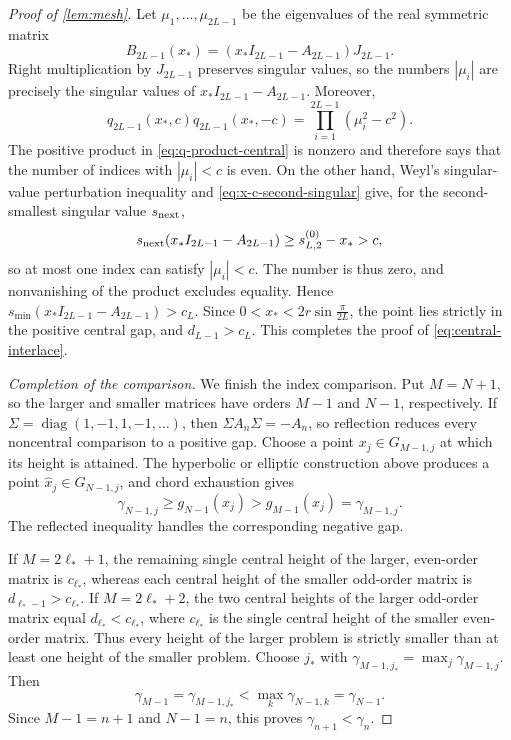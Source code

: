 \documentclass[review,hidelinks,onefignum,onetabnum]{siamart251216}
\DeclareMathOperator{\diag}{diag}
\begin{document}
\begin{proof}[Proof of \cref{lem:mesh}]
Let \(\mu_1,\ldots,\mu_{2L-1}\) be the eigenvalues of the real symmetric
matrix
\[
 B_{2L-1}(x_*)=(x_*I_{2L-1}-A_{2L-1})J_{2L-1}.
\]
Right multiplication by \(J_{2L-1}\) preserves singular values, so the
numbers \(|\mu_i|\) are precisely the singular values of
\(x_*I_{2L-1}-A_{2L-1}\).  Moreover,
\[
 q_{2L-1}(x_*,c)q_{2L-1}(x_*,-c)
 =\prod_{i=1}^{2L-1}(\mu_i^2-c^2).
\]
The positive product in \eqref{eq:q-product-central} is nonzero and
therefore says that the number of indices with \(|\mu_i|<c\) is
even.  On the other hand, Weyl's singular-value perturbation inequality
and \eqref{eq:x-c-second-singular} give, for the second-smallest singular
value \(s_{\rm next}\),
\[
 s_{\rm next}(x_*I_{2L-1}-A_{2L-1})
 \geq s_{L,2}^{(0)}-x_*>c,
\]
so at most one index can satisfy \(|\mu_i|<c\).  The number is thus
zero, and nonvanishing of the product excludes equality.  Hence
\(s_{\min}(x_*I_{2L-1}-A_{2L-1})>c_L\).  Since
\(0<x_*<2r\sin\frac{\pi}{2L}\), the point lies strictly in the positive
central gap, and \(d_{L-1}>c_L\).  This completes the proof of
\eqref{eq:central-interlace}.

\medskip\noindent\emph{Completion of the comparison.}\quad
We finish the index comparison.  Put \(M=N+1\), so the larger and
smaller matrices have orders \(M-1\) and \(N-1\), respectively.  If
\(\Sigma=\diag(1,-1,1,-1,\ldots)\), then
\(\Sigma A_n\Sigma=-A_n\), so reflection reduces every noncentral
comparison to a positive gap.  Choose a point
\(x_j\in G_{M-1,j}\) at which its height is attained.  The hyperbolic
or elliptic construction above produces a point
\(\widehat x_j\in G_{N-1,j}\), and chord exhaustion gives
\[
 \gamma_{N-1,j}\geq g_{N-1}(\widehat x_j)
 >g_{M-1}(x_j)=\gamma_{M-1,j}.
\]
The reflected inequality handles the corresponding negative gap.

If \(M=2\ell_*+1\), the remaining single central height of the larger,
even-order matrix is \(c_{\ell_*}\), whereas each central height of the
smaller odd-order matrix is \(d_{\ell_*-1}>c_{\ell_*}\).  If
\(M=2\ell_*+2\), the two central heights of the larger odd-order matrix
equal \(d_{\ell_*}<c_{\ell_*}\), where \(c_{\ell_*}\) is the single
central height of the smaller even-order matrix.
Thus every height of the larger problem is strictly smaller than at
least one height of the smaller problem.  Choose \(j_*\) with
\(\gamma_{M-1,j_*}=\max_j\gamma_{M-1,j}\).  Then
\[
 \gamma_{M-1}=\gamma_{M-1,j_*}
 <\max_k\gamma_{N-1,k}=\gamma_{N-1}.
\]
Since \(M-1=n+1\) and \(N-1=n\), this proves
\(\gamma_{n+1}<\gamma_n\).
\end{proof}
\end{document}
